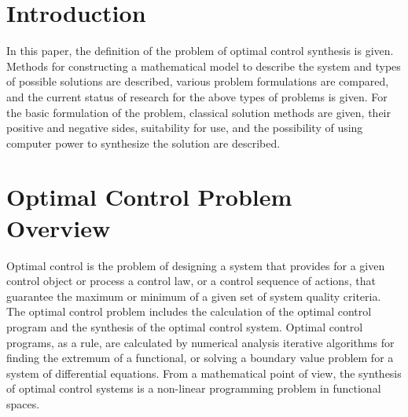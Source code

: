 

\usepackage[utf8]{inputenc}                %
\usepackage[british]{babel}
\usepackage[pdftex]{graphicx}              %

\setlength{\parindent}{0pt}
\setlength{\parskip}{1em}


    
    \tableofcontents
    \clearpage
    \section{Introduction}
    In this paper, the definition of the problem of optimal control synthesis is given. Methods for constructing a mathematical model to describe the system and types of possible solutions are described, various problem formulations are compared, and the current status of research for the above types of problems is given.
    For the basic formulation of the problem, classical solution methods are given, their positive and negative sides, suitability for use, and the possibility of using computer power to synthesize the solution are described.

    \section{Optimal Control Problem Overview}
    Optimal control is the problem of designing a system that provides for a given control object or process a control law, or a control sequence of actions, that guarantee the maximum or minimum of a given set of system quality criteria.
    The optimal control problem includes the calculation of the optimal control program and the synthesis of the optimal control system.
    Optimal control programs, as a rule, are calculated by numerical analysis iterative algorithms for finding the extremum of a functional, or solving a boundary value problem for a system of differential equations.
    From a mathematical point of view, the synthesis of optimal control systems is a non-linear programming problem in functional spaces.


